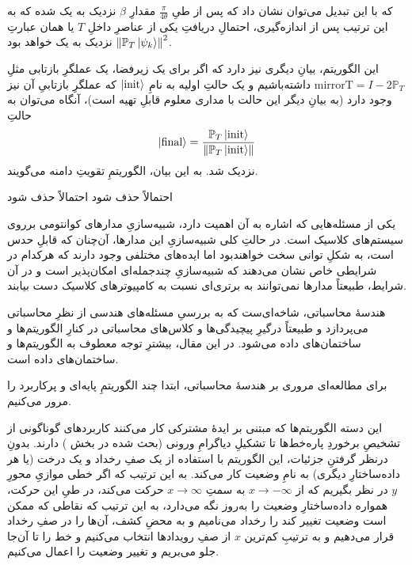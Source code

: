 \documentclass[a4paper,12pt]{article}
\begin{document}
که با این تبدیل می‌توان نشان داد که پس از طیِ
$\frac{\pi}{4\theta}$
مقدارِ $\beta$ نزدیک به یک شده که به این ترتیب پس از اندازه‌گیری، احتمالِ دریافتِ یکی از عناصرِ داخلِ $T$ یا همان عبارتِ 
$\norm{\mathbb{P}_T \ket{\psi_k}}^2$
نزدیک به یک خواهد بود.

این الگوریتم، بیانِ دیگری نیز دارد که اگر برای یک زیرفضا، یک عملگرِ بازتابی مثلِ
$\text{mirrorT} = I - 2\mathbb{P}_T$
داشته‌باشیم و یک حالتِ اولیه به نامِ 
$\ket{\text{init}}$
 که عملگرِ بازتابیِ آن نیز وجود دارد (به بیانِ دیگر این حالت با مداری معلوم قابلِ تهیه است)، آنگاه می‌توان به حالتِ
\begin{equation}
    \ket{\text{final}} = \frac{\mathbb{P}_T \ket{\text{init}}}{\norm{\mathbb{P}_T \ket{\text{init}}}}
\end{equation}
نزدیک شد.
به این بیان، الگوریتمِ تقویتِ دامنه می‌گویند.


احتمالاً حذف شود
احتمالاً حذف شود

یکی از مسئله‌هایی که اشاره به آن اهمیت دارد، شبیه‌سازیِ مدارهای کوانتومی برروی سیستم‌های کلاسیک است. در حالتِ کلی شبیه‌سازیِ این مدارها، آن‌چنان که قابلِ حدس است، به شکلِ توانی سخت خواهندبود اما ایده‌های مختلفی وجود دارند که هرکدام در شرایطی خاص نشان می‌دهند که شبیه‌سازیِ چندجمله‌ای امکان‌پذیر است و در آن شرایط، طبیعتاً مدارها نمی‌توانند به برتری‌ای نسبت به کامپیوترهای کلاسیک دست بیابند.


هندسهٔ محاسباتی، شاخه‌ای‌ست که به بررسیِ مسئله‌های هندسی از نظرِ محاسباتی می‌پردازد و طبیعتاً درگیرِ پیچیدگی‌ها و کلاس‌های محاسباتی در کنارِ الگوریتم‌ها و ساختمان‌های داده می‌شود. در این مقال، بیشترِ توجه معطوف به الگوریتم‌ها و ساختمان‌های داده است.

برای مطالعه‌ای مروری بر هندسهٔ محاسباتی، ابتدا چند الگوریتمِ پایه‌ای و پرکاربرد را مرور می‌کنیم.

این دسته الگوریتم‌ها که مبتنی بر ایدهٔ مشترکی کار می‌کنند کاربردهای گوناگونی از تشخیصِ برخوردِ پاره‌خط‌ها تا تشکیلِ 
دیاگرامِ ورونی (بحث شده در بخش )
دارند. بدونِ درنظر گرفتنِ جزئیات، این الگوریتم با استفاده از یک صفِ رخداد و یک درخت (یا هر داده‌ساختارِ دیگری) به نامِ وضعیت کار می‌کند. به این ترتیب که اگر خطی موازیِ محورِ $y$ در نظر بگیریم که از $x\to-\infty$ به سمتِ $x\to\infty$ حرکت می‌کند، در طیِ این حرکت، همواره داده‌ساختارِ وضعیت را به‌روز نگه می‌دارد، به این ترتیب که نقاطی که ممکن است وضعیت تغییر کند را رخداد می‌نامیم و به محضِ کشف، آن‌ها را در صفِ رخداد قرار می‌دهیم و به ترتیبِ کم‌ترین $x$ از صفِ رویدادها انتخاب می‌کنیم و خط را تا آن‌جا جلو می‌بریم و تغییر وضعیت را اعمال می‌کنیم.
\end{document}
